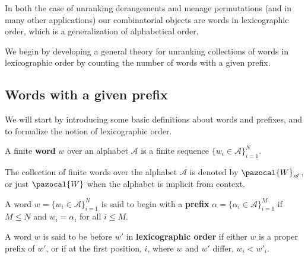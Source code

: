 In both the case of unranking derangements and menage permutations
(and in many other applications) our combinatorial objects are
words in lexicographic order, which is a generalization of alphabetical order.

We begin by developing a general theory for unranking collections of words in
lexicographic order by counting the number of words with a given prefix.
\subsection{Words with a given prefix}

We will start by introducing some basic definitions about words and prefixes,
and to formalize the notion of lexicographic order.

\begin{definition}
  A finite \textbf{word} $w$ over an alphabet $\mathcal A$ is a finite sequence
  $\{w_i \in \mathcal A\}_{i=1}^N$.

  The collection of finite words over the alphabet $\mathcal A$ is denoted by
  $\pazocal{W}_\mathcal{A}$, or just $\pazocal{W}$ when the alphabet is
  implicit from context.
\end{definition}

\begin{definition}
  A word $w = \{w_i \in \mathcal A\}_{i=1}^N$ is said to begin with a
  \textbf{prefix} $\alpha = \{\alpha_i \in \mathcal A\}_{i=1}^M$ if
  $M \leq N$ and $w_i = \alpha_i$ for all $i \leq M$.
\end{definition}

\begin{definition}
  A word $w$ is said to be before $w'$ in \textbf{lexicographic order}
  if either $w$ is a proper prefix of $w'$, or if at the first position, $i$,
  where $w$ and $w'$ differ, $w_i < w'_i$.
\end{definition}

